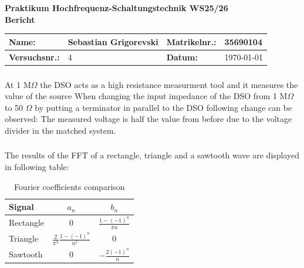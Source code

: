 \documentclass[a4paper,12pt]{article}
\begin{document}
	
	\begin{center}
		{\LARGE \textbf{Praktikum Hochfrequenz-Schaltungstechnik WS25/26}} \\[1em]
		{\large  \textbf{Bericht}} \\[0.5em]
	\end{center}
	
\begin{center}
	\begin{tabular}{|l|p{4cm}|l|p{4cm}|}
		\hline
		\textbf{Name:} &  Sebastian Grigorevski & \textbf{Matrikelnr.:} &  35690104 \\
		\hline
		\textbf{Versuchsnr.:} & 4 & \textbf{Datum:} & \today \\
		\hline
	\end{tabular}
\end{center}
	
	\vspace{1cm}
	\setcounter{section}{4}  %
	\setcounter{subsection}{4}  %
	\setcounter{subsubsection}{0}  %

	\subsubsection{}
	
	At 1 M$\Omega$ the DSO acts as a high resistance measurment tool and it measures the value of the source
	When changing the input impedance of the DSO from 1 M$\Omega$ to 50 $\Omega$ by putting a terminator in parallel to the DSO following change can be observed: The measured voltage is half the value from before due to the voltage divider in the matched system.
	
	\subsubsection{}

	The results of the FFT of a rectangle, triangle and a sawtooth wave are displayed in following table:
	
	\begin{table}[h]
	\centering
		\caption{Fourier coefficients comparison}
	\begin{tabular}{l|c|c}
		Signal  & $a_n$ & $b_n$ \\ \hline
		Rectangle  & $0$ & $\frac{1-(-1)^n}{\pi n}$ \\
		Triangle  & $\frac{2}{\pi^2}\frac{1-(-1)^n}{n^2}$ & $0$ \\
		Sawtooth  & $0$ & $-\frac{2(-1)^{n}}{n}$
	\end{tabular}
	\end{table}
\end{document}
